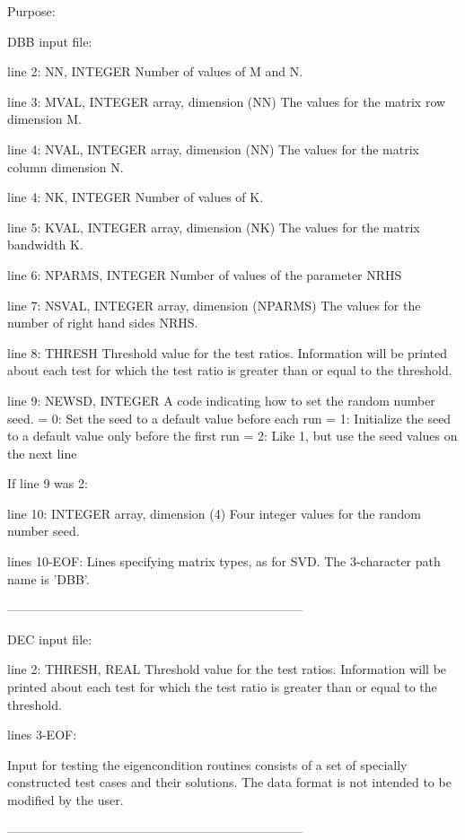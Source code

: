 \begin{DoxyParagraph}{Purpose\+: }
\begin{DoxyVerb}
 DBB input file:

 line 2:  NN, INTEGER
          Number of values of M and N.

 line 3:  MVAL, INTEGER array, dimension (NN)
          The values for the matrix row dimension M.

 line 4:  NVAL, INTEGER array, dimension (NN)
          The values for the matrix column dimension N.

 line 4:  NK, INTEGER
          Number of values of K.

 line 5:  KVAL, INTEGER array, dimension (NK)
          The values for the matrix bandwidth K.

 line 6:  NPARMS, INTEGER
          Number of values of the parameter NRHS

 line 7:  NSVAL, INTEGER array, dimension (NPARMS)
          The values for the number of right hand sides NRHS.

 line 8:  THRESH
          Threshold value for the test ratios.  Information will be
          printed about each test for which the test ratio is greater
          than or equal to the threshold.

 line 9:  NEWSD, INTEGER
          A code indicating how to set the random number seed.
          = 0:  Set the seed to a default value before each run
          = 1:  Initialize the seed to a default value only before the
                first run
          = 2:  Like 1, but use the seed values on the next line

 If line 9 was 2:

 line 10: INTEGER array, dimension (4)
          Four integer values for the random number seed.

 lines 10-EOF:  Lines specifying matrix types, as for SVD.
          The 3-character path name is 'DBB'.

-----------------------------------------------------------------------

 DEC input file:

 line  2: THRESH, REAL
          Threshold value for the test ratios.  Information will be
          printed about each test for which the test ratio is greater
          than or equal to the threshold.

 lines  3-EOF:

 Input for testing the eigencondition routines consists of a set of
 specially constructed test cases and their solutions.  The data
 format is not intended to be modified by the user.

-----------------------------------------------------------------------


\end{DoxyVerb}
\end{DoxyParagraph}
